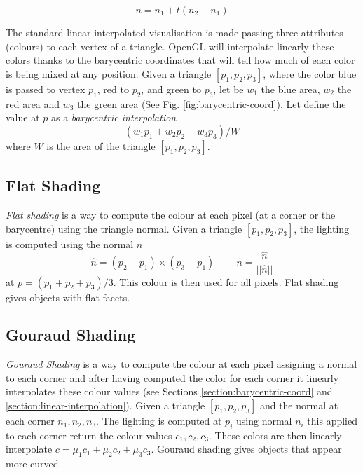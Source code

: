 $$ n = n_1 + t (n_2 - n_1)$$


The standard linear interpolated visualisation is made passing three attributes (colours) to each vertex of a triangle. OpenGL will interpolate linearly these colors thanks to the barycentric coordinates that will tell how much of each color is being mixed at any position.
Given a triangle $[p_1, p_2, p_3]$, where the color blue is passed to vertex $p_1$, red to $p_2$, and green to $p_3$, let be $w_1$ the blue area, $w_2$ the red area and $w_3$ the green area (See Fig. \ref{fig:barycentric-coord}). Let define the value at $p$ as a \textit{barycentric interpolation} $$(w_1p_1 + w_2p_2 + w_3p_3)/W$$ where $W$ is the area of the triangle $[p_1, p_2, p_3]$.


\subsection{Flat Shading}
\textit{Flat shading} is a way to compute the colour at each pixel (at a corner or the barycentre) using the triangle normal.
Given a triangle $[p_1, p_2, p_3]$, the lighting is computed using the normal $n$ $$\widehat{n} = (p_2 - p_1) \times (p_3 - p_1) \;\;\;\;\;\;\;\; n = \frac{ \widehat{n} } { ||\widehat{n}|| } $$ at $p= (p_1 + p_2 + p_3)/3$. This colour is then used for all pixels. Flat shading gives objects with flat facets.
\cite{SLIDE:ICORSI}

\subsection{Gouraud Shading}
\textit{Gouraud Shading} is a way to compute the colour at each pixel assigning a normal to each corner and after having computed the color for each corner it linearly interpolates these colour values (see Sections \ref{section:barycentric-coord} and \ref{section:linear-interpolation}).
Given a triangle $[p_1, p_2, p_3]$ and the normal at each corner $n_1, n_2, n_3$.
The lighting is computed at $p_i$ using normal $n_i$ this applied to each corner return the colour values $c_1, c_2, c_3$.
These colors are then linearly interpolate $c = {\mu}_1 c_1 + {\mu}_2 c_2 + {\mu}_3 c_3$. Gouraud shading gives objects that appear more curved. \cite{SLIDE:ICORSI}


